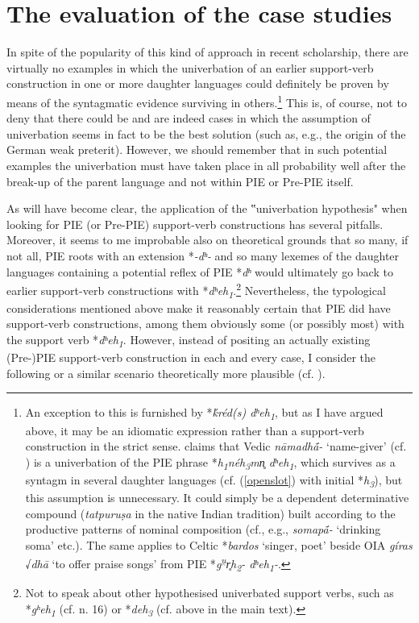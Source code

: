 \documentclass[output=paper,colorlinks,citecolor=brown]{langscibook}
\begin{document}
\section{The evaluation of the case studies}

In spite of the popularity of this kind of approach in recent scholarship, there are virtually no examples in which the univerbation of an earlier support-verb construction in one or more daughter languages could definitely be proven by means of the syntagmatic evidence surviving in others.\footnote{An exception to this is furnished by *\textit{ḱréd(s) dʰeh\textsubscript{1}}, but as I have argued above, it may be an idiomatic expression rather than a support-verb construction in the strict sense. \citet[116]{Schutzeichel2014} claims that Vedic \textit{nāmadhā́-} ‘name-giver’ (cf. \citealt[254--255]{Scarlata1999}) is a univerbation of the PIE phrase *\textit{h\textsubscript{1}néh\textsubscript{3}mn̥ dʰeh\textsubscript{1}}, which survives as a syntagm in several daughter languages (cf. (\ref{openslot}) with initial *\textit{h\textsubscript{3}}), but this assumption is unnecessary. It could simply be a dependent determinative compound (\textit{tatpuruṣa} in the native Indian tradition) built according to the productive patterns of nominal composition (cf., e.g., \textit{somapā́-} ‘drinking soma’ etc.). The same applies to Celtic *\textit{bardos} ‘singer, poet’ beside OIA \textit{gíras} √\textit{dhā} ‘to offer praise songs’ from PIE *\textit{g\textsuperscript{u̯}r̥h\textsubscript{2}- dʰeh\textsubscript{1}-}.}       This is, of course, not to deny that there could be and are indeed cases in which the assumption of univerbation seems in fact to be the best solution (such as, e.g., the origin of the German weak preterit). However, we should remember that in such potential examples the univerbation must have taken place in all probability well after the break-up of the parent language and not within PIE or Pre-PIE itself.

As will have become clear, the application of the ‟univerbation hypothesis" when looking for PIE (or Pre-PIE) support-verb constructions has several pitfalls. Moreover, it seems to me improbable also on theoretical grounds that so many, if not all, PIE roots with an extension *\textit{-dʰ-} and so many lexemes of the daughter languages containing a potential reflex of PIE *\textit{dʰ} would ultimately go back to earlier support-verb constructions with *\textit{dʰeh\textsubscript{1}}.\footnote{Not to speak about other hypothesised univerbated support verbs, such as *\textit{gʰeh\textsubscript{1}} (cf. n. 16) or *\textit{deh\textsubscript{3}} (cf. above in the main text).}  Nevertheless, the typological considerations mentioned above make it reasonably certain that PIE did have support-verb constructions, among them obviously some (or possibly most) with the support verb *\textit{dʰeh\textsubscript{1}}. However, instead of positing an actually existing (Pre-)PIE support-verb construction in each and every case, I consider the following or a similar scenario theoretically more plausible (cf. \citealt[145--150]{Schutzeichel2014}).
\end{document}
